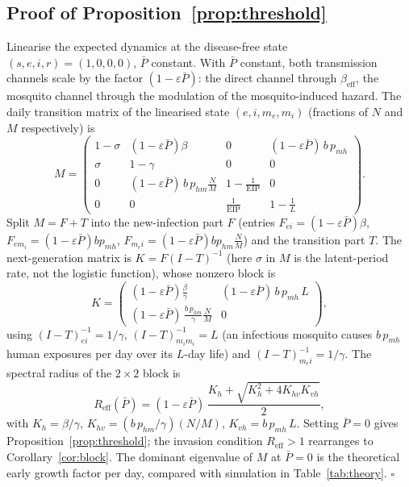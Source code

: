 \documentclass[]{interact}
\begin{document}
\subsection*{Proof of Proposition~\ref{prop:threshold}}
Linearise the expected dynamics at the disease-free state $(s,e,i,r)=(1,0,0,0)$, $\bar{P}$ constant. With $\bar{P}$ constant, both transmission channels scale by the factor $(1-\varepsilon\bar{P})$: the direct channel through $\beta_{\mathrm{eff}}$, the mosquito channel through the modulation of the mosquito-induced hazard. The daily transition matrix of the linearised state $(e, i, m_e, m_i)$ (fractions of $N$ and $M$ respectively) is
\[
M = \begin{pmatrix}
1-\sigma & (1-\varepsilon\bar{P})\beta & 0 & (1-\varepsilon\bar{P})\,b\,p_{mh}\\
\sigma & 1-\gamma & 0 & 0\\
0 & (1-\varepsilon\bar{P})\,b\,p_{hm}\tfrac{N}{M} & 1-\tfrac{1}{\mathrm{EIP}} & 0\\
0 & 0 & \tfrac{1}{\mathrm{EIP}} & 1-\tfrac{1}{L}
\end{pmatrix}.
\]
Split $M = F + T$ into the new-infection part $F$ (entries $F_{e i} = (1-\varepsilon\bar{P})\beta$, $F_{e m_i} = (1-\varepsilon\bar{P}) b p_{mh}$, $F_{m_e i} = (1-\varepsilon\bar{P}) b p_{hm} \tfrac{N}{M}$) and the transition part $T$. The next-generation matrix is $K = F(I-T)^{-1}$ \cite{diekmann1990definition,vandendriessche2002reproduction} (here $\sigma$ in $M$ is the latent-period rate, not the logistic function), whose nonzero block is
\[
K = \begin{pmatrix}
(1-\varepsilon\bar{P})\tfrac{\beta}{\gamma} & (1-\varepsilon\bar{P})\, b\,p_{mh}\,L\\
(1-\varepsilon\bar{P})\,\tfrac{b\,p_{hm}}{\gamma}\tfrac{N}{M} & 0
\end{pmatrix},
\]
using $(I-T)^{-1}_{e i} = 1/\gamma$, $(I-T)^{-1}_{m_i m_i} = L$ (an infectious mosquito causes $b\,p_{mh}$ human exposures per day over its $L$-day life) and $(I-T)^{-1}_{m_e i} = 1/\gamma$. The spectral radius of the $2\times2$ block is
\[
R_{\mathrm{eff}}(\bar{P}) = (1-\varepsilon\bar{P})\,\frac{K_h + \sqrt{K_h^2 + 4K_{hv}K_{vh}}}{2},
\]
with $K_h = \beta/\gamma$, $K_{hv} = (b\,p_{hm}/\gamma)(N/M)$, $K_{vh} = b\,p_{mh}\,L$. Setting $\bar{P}=0$ gives Proposition~\ref{prop:threshold}; the invasion condition $R_{\mathrm{eff}} > 1$ rearranges to Corollary~\ref{cor:block}. The dominant eigenvalue of $M$ at $\bar{P}=0$ is the theoretical early growth factor per day, compared with simulation in Table~\ref{tab:theory}. $\square$
\end{document}
